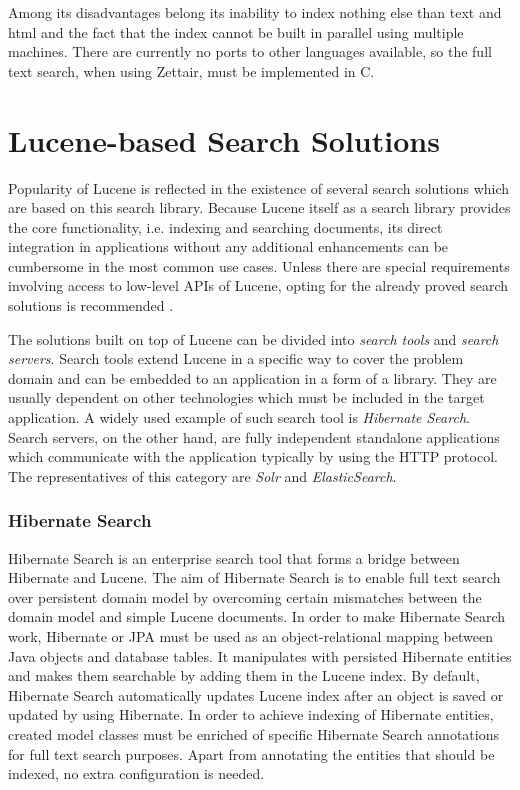 Among its disadvantages belong its inability to index nothing else than text and html and the fact that the index cannot be built in
parallel using multiple machines. 
There are currently no ports to other languages available, so the full text search, when using Zettair, must be implemented in C.


\section{Lucene-based Search Solutions}
\label{sec:luceneBasedSolutions}

Popularity of Lucene is reflected in the existence of several search solutions which are based on this search library.
Because Lucene itself as a search library provides the core functionality, i.e. indexing and searching documents, its direct integration in applications without any additional enhancements can be cumbersome in the most common use cases.
Unless there are special requirements involving access to low-level APIs of Lucene, opting for the already proved search solutions is recommended \cite{Solr3EnterpriseSS}.

The solutions built on top of Lucene can be divided into \textit{search tools} and \textit{search servers}. 
Search tools extend Lucene in a specific way to cover the problem domain and can be embedded to an application in a form of a library. 
They are usually dependent on other technologies which must be included in the target application. 
A widely used example of such search tool is \textit{Hibernate Search}.
Search servers, on the other hand, are fully independent standalone applications which communicate with the application typically by using the HTTP protocol. The representatives of this category are \textit{Solr} and \textit{ElasticSearch}.


\subsubsection{Hibernate Search}

Hibernate Search \cite{HibernateSearchHome} is an enterprise search tool that forms a bridge between Hibernate and Lucene. 
The aim of Hibernate Search is to enable full text search over persistent domain model by overcoming certain mismatches between the domain model and simple Lucene documents.
In order to make Hibernate Search work, Hibernate or JPA must be used as an object-relational mapping between Java objects and database tables. 
It manipulates with persisted Hibernate entities and makes them searchable by adding them in the Lucene index. 
By default, Hibernate Search automatically updates Lucene index after an object is saved or updated by using Hibernate.
In order to achieve indexing of Hibernate entities, created model classes must be enriched of specific Hibernate Search annotations for full text search purposes.
Apart from annotating the entities that should be indexed, no extra configuration is needed. 


